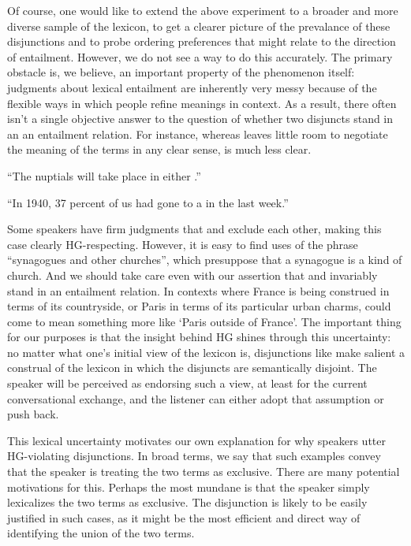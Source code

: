 \documentclass{article}
\begin{document}
Of course, one would like to extend the above experiment to a broader
and more diverse sample of the lexicon, to get a clearer picture of
the prevalance of these disjunctions and to probe ordering preferences
that might relate to the direction of entailment. However, we do not
see a way to do this accurately. The primary obstacle is, we believe,
an important property of the phenomenon itself: judgments about
lexical entailment are inherently very messy because of the flexible
ways in which people refine meanings in context. As a result, there
often isn't a single objective answer to the question of whether two
disjuncts stand in an an entailment relation. For instance, whereas
 leaves little room to negotiate the
meaning of the terms in any clear sense,
 is much less clear.
%
\begin{examples}
\item\label{exclusive}
  \begin{examples}
  \item\label{franceorparis} ``The nuptials will take place in either
    .''
  \item\label{churchorsynagogue} ``In 1940, 37 percent of us had gone
    to a  in the last week.''
  \end{examples}
\end{examples}
%
Some speakers have firm judgments that  and
 exclude each other, making this case clearly
HG-respecting. However, it is easy to find uses of the phrase
``synagogues and other churches'', which presuppose that a synagogue
is a kind of church. And we should take care even with our assertion
that  and  invariably stand in an entailment
relation. In contexts where France is being construed in terms of its
countryside, or Paris in terms of its particular urban charms,
 could come to mean something more like `Paris outside of
France'. The important thing for our purposes is that the insight
behind HG shines through this uncertainty: no matter what one's
initial view of the lexicon is, disjunctions like  make
salient a construal of the lexicon in which the disjuncts are
semantically disjoint. The speaker will be perceived as endorsing such
a view, at least for the current conversational exchange, and the
listener can either adopt that assumption or push back.

This lexical uncertainty motivates our own explanation for why
speakers utter HG-violating disjunctions. In broad terms, we say that
such examples convey that the speaker is treating the two terms as
exclusive. There are many potential motivations for this. Perhaps the
most mundane is that the speaker simply lexicalizes the two terms as
exclusive. The disjunction is likely to be easily justified in such
cases, as it might be the most efficient and direct way of identifying
the union of the two terms.
\end{document}
